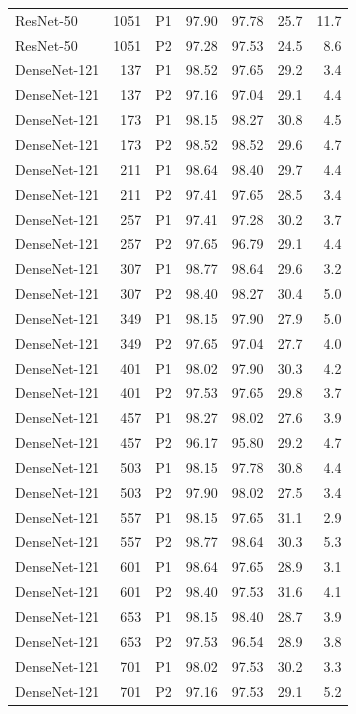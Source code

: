 {\begin{longtable}{lrlrrrr}
ResNet-50 & 1051 & P1 & 97.90 & 97.78 & 25.7 & 11.7 \\
ResNet-50 & 1051 & P2 & 97.28 & 97.53 & 24.5 & 8.6 \\
DenseNet-121 & 137 & P1 & 98.52 & 97.65 & 29.2 & 3.4 \\
DenseNet-121 & 137 & P2 & 97.16 & 97.04 & 29.1 & 4.4 \\
DenseNet-121 & 173 & P1 & 98.15 & 98.27 & 30.8 & 4.5 \\
DenseNet-121 & 173 & P2 & 98.52 & 98.52 & 29.6 & 4.7 \\
DenseNet-121 & 211 & P1 & 98.64 & 98.40 & 29.7 & 4.4 \\
DenseNet-121 & 211 & P2 & 97.41 & 97.65 & 28.5 & 3.4 \\
DenseNet-121 & 257 & P1 & 97.41 & 97.28 & 30.2 & 3.7 \\
DenseNet-121 & 257 & P2 & 97.65 & 96.79 & 29.1 & 4.4 \\
DenseNet-121 & 307 & P1 & 98.77 & 98.64 & 29.6 & 3.2 \\
DenseNet-121 & 307 & P2 & 98.40 & 98.27 & 30.4 & 5.0 \\
DenseNet-121 & 349 & P1 & 98.15 & 97.90 & 27.9 & 5.0 \\
DenseNet-121 & 349 & P2 & 97.65 & 97.04 & 27.7 & 4.0 \\
DenseNet-121 & 401 & P1 & 98.02 & 97.90 & 30.3 & 4.2 \\
DenseNet-121 & 401 & P2 & 97.53 & 97.65 & 29.8 & 3.7 \\
DenseNet-121 & 457 & P1 & 98.27 & 98.02 & 27.6 & 3.9 \\
DenseNet-121 & 457 & P2 & 96.17 & 95.80 & 29.2 & 4.7 \\
DenseNet-121 & 503 & P1 & 98.15 & 97.78 & 30.8 & 4.4 \\
DenseNet-121 & 503 & P2 & 97.90 & 98.02 & 27.5 & 3.4 \\
DenseNet-121 & 557 & P1 & 98.15 & 97.65 & 31.1 & 2.9 \\
DenseNet-121 & 557 & P2 & 98.77 & 98.64 & 30.3 & 5.3 \\
DenseNet-121 & 601 & P1 & 98.64 & 97.65 & 28.9 & 3.1 \\
DenseNet-121 & 601 & P2 & 98.40 & 97.53 & 31.6 & 4.1 \\
DenseNet-121 & 653 & P1 & 98.15 & 98.40 & 28.7 & 3.9 \\
DenseNet-121 & 653 & P2 & 97.53 & 96.54 & 28.9 & 3.8 \\
DenseNet-121 & 701 & P1 & 98.02 & 97.53 & 30.2 & 3.3 \\
DenseNet-121 & 701 & P2 & 97.16 & 97.53 & 29.1 & 5.2 \\

\end{longtable}}
